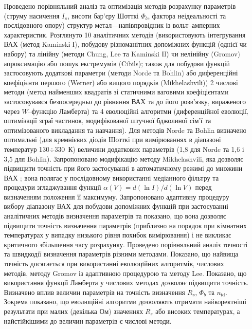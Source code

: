 Проведено порівняльний аналіз та оптимізація методів розрахунку параметрів (струму насичення  $I_s$, висоти бар'єру Шотткі  $\Phi_b$, фактора неідеальності та послідовного опору) структур метал---напівпровідник із вольт--амперних характеристик.
Розглянуто 10 аналітичних методів (використовують інтегрування ВАХ (метод Kaminski І), побудову різноманітних допоміжних функцій (однієї чи набору) та лінійну (методи Chung, Lee та Kaminski ІІ) чи нелінійну (Gromov) апроксимацію або пошук екстремумів (Cibils);
також для побудови функцій застосовують додаткові параметри (методи Norde та Bohlin) або диференційні коефіцієнти першого (Werner) або вищого порядків (Mikhelashvili))
2 числові методи (метод найменших квадратів зі статичними ваговими коефіцієнтами застосовувався безпосередньо до рівняння ВАХ та до його розв'язку, вираженого через $W$--функцію Ламберта) та
4 еволюційні алгоритми (диференційної еволюції,
оптимізації зграї частинок,
модифікованої штучної бджолиної сім'ї  та
оптимізованого викладання та навчання).
Для методів Norde та Bohlin визначено  оптимальні (для кремнієвих діодів Шотткі при вимірюваннях в діапазоні температур 130$\div$330~К) величини додаткових параметрів (1,8 для Norde та 1,6 і 3,5 для Bohlin).
Запропоновано модифікацію методу Mikhelashvili, яка дозволяє підвищити точність при його застосуванні в автоматичному режимі до множини ВАХ ;
вона полягає у послідовному використанні медіанного фільтру та процедури згладжування функції $\alpha(V)=d(\ln I)/d(\ln V)$ перед визначенням положення її максимуму.
Запропоновано адаптивну процедуру вибору діапазону ВАХ для побудови допоміжних функцій при застосуванні аналітичних методів визначення параметрів та показано, що вона дозволяє підвищити точність визначення параметрів (приблизно на порядок при кімнатних температурах у випадку низького рівня похибок вимірювання) і не викликає критичного збільшення часу розрахунку.
Проведено порівняльний аналіз точності  та швидкодії  визначення параметрів різними методами.
Показано, що найвища точність досягається при використанні еволюцiйних алгоритмів, числових методів, методу Gromov із адаптивною процедурою та методу Lee.
Показано, що використання функції Ламберта у числових методах дозволяє підвищити точність.
Визначено вплив величин параметрів на точність визначення $R_s$, $\Phi_b$ та $n_\mathrm{id}$.
Зокрема показано, що еволюційні алгоритми дозволяють отримати найкоректніші результати при малих (декілька Ом) значеннях $R_s$ або високих температурах, а найстійкішими до величин параметрів є числові методи.

